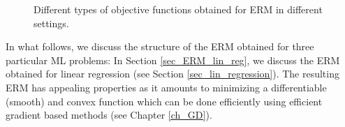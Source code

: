 \documentclass[12pt]{report}
\begin{document}
	
\begin{figure}[htbp]
\begin{center}
\end{center}
\caption{Different types of objective functions obtained for ERM in different settings.}
\label{fig_diff_types_bojec}
\end{figure}



In what follows, we discuss the structure of the ERM obtained for three particular ML problems: 
In Section \ref{sec_ERM_lin_reg}, we discuss the ERM obtained for linear regression (see Section \ref{sec_lin_regression}). 
The resulting ERM has appealing properties as it amounts to minimizing a differentiable (smooth) 
and convex function which can be done efficiently using efficient gradient based methods (see Chapter \ref{ch_GD}). 
\end{document}
